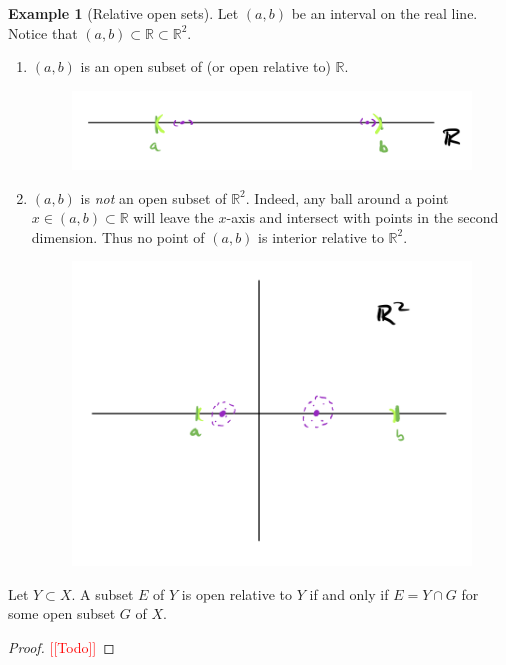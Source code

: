 \documentclass[11pt]{article}
\numberwithin{equation}{section}
\theoremstyle{definition}
\theoremstyle{definition}
\newtheorem{example}{\color{WildStrawberry}Example}[section]
\newcommand{\1}{\mathbbm 1}
\newcommand{\RR}{\mathbb R}
\begin{document}
\begin{example}[Relative open sets]
	Let $(a,b)$ be an interval on the real line. Notice that $(a,b) \subset \RR \subset \RR^2$.
	\begin{enumerate}
		\item $(a,b)$ is an open subset of (or open relative to) $\RR$.
		\begin{figure}[H]
			\begin{center}
				\includegraphics[scale=.75]{open_relative_r.png}
			\end{center}
		\end{figure}
		\item $(a,b)$ is \emph{not} an open subset of $\RR^2$. Indeed, any ball around a point $x \in (a,b) \subset \RR$ will leave the $x$-axis and intersect with points in the second dimension. Thus no point of $(a,b)$ is interior relative to $\RR^2$.
		\begin{figure}[H]
			\begin{center}
				\includegraphics[scale=.75]{open_relative_r2.png}
			\end{center}
		\end{figure}  
	\end{enumerate}
\end{example}


\begin{theorem}
	Let $Y \subset X$. A subset $E$ of $Y$ is open relative to $Y$ if and only if $E = Y \cap G$ for some open subset $G$ of $X$. 
\end{theorem}
\begin{proof}
	\textcolor{red}{[[Todo]]}
\end{proof}
\end{document}
